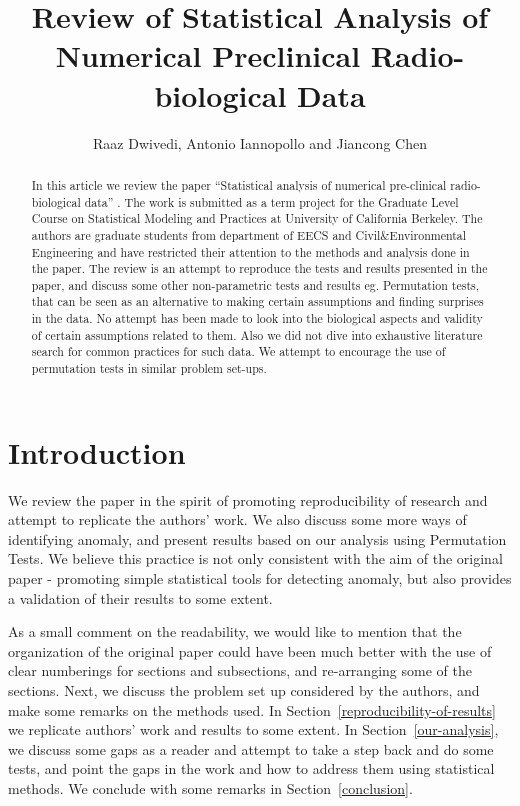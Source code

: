 \documentclass{article}
\title{Review of Statistical Analysis of Numerical Preclinical Radio-biological Data}
\author{Raaz Dwivedi,  Antonio Iannopollo and Jiancong Chen}
\begin{document}
    \maketitle



\begin{abstract}
In this article we review the paper ``Statistical analysis of numerical
pre-clinical radio-biological data'' \cite{pitt2016statistical}. The work is submitted as a term
project for the Graduate Level Course on Statistical Modeling and
Practices at University of California Berkeley. The authors are graduate
students from department of EECS and Civil\&Environmental Engineering
and have restricted their attention to the methods and analysis done in
the paper. The review is an attempt to reproduce the tests and results
presented in the paper, and discuss some other non-parametric tests and
results eg. Permutation tests, that can be seen as an alternative to
making certain assumptions and finding surprises in the data. No attempt
has been made to look into the biological aspects and validity of
certain assumptions related to them. Also we did not dive into exhaustive literature search for common practices for such data. We attempt to encourage the use of permutation tests in similar problem set-ups.
\end{abstract}

\section{Introduction} %
\label{sec:introduction}


We review the paper in the spirit of promoting reproducibility of research and attempt to replicate the authors' work. We also discuss some more ways of identifying anomaly, and present results based on our analysis using Permutation Tests. We believe this practice is not only consistent with the aim of the original paper - promoting simple statistical tools for detecting anomaly, but also provides a validation of their results to some extent.

As a small comment on the readability, we would like to mention that the organization of the original paper could have been much better with the use of clear numberings for sections and subsections, and re-arranging some of the sections. Next, we discuss the problem set up considered by the authors, and make some remarks on the methods used. In Section~\ref{reproducibility-of-results} we replicate authors' work and results to some extent. In Section~\ref{our-analysis}, we discuss some gaps as a reader and attempt to take a step back and do some tests, and point the gaps in the work and how to address them using statistical methods. We conclude with some remarks in Section~\ref{conclusion}.
\end{document}

